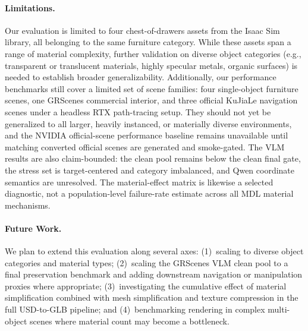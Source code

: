 \paragraph{Limitations.}
Our evaluation is limited to four chest-of-drawers assets from the Isaac Sim
library, all belonging to the same furniture category. While these assets span
a range of material complexity, further validation on diverse object categories
(e.g., transparent or translucent materials, highly specular metals, organic
surfaces) is needed to establish broader generalizability. Additionally, our
performance benchmarks still cover a limited set of scene families: four
single-object furniture scenes, one GRScenes commercial interior, and three
official KuJiaLe navigation scenes under a headless RTX path-tracing setup.
They should not yet be generalized to all larger, heavily instanced, or
materially diverse environments, and the NVIDIA official-scene performance
baseline remains unavailable until matching converted official scenes are
generated and smoke-gated. The VLM results are also claim-bounded: the clean pool remains
below the clean final gate, the stress set is target-centered and category
imbalanced, and Qwen coordinate semantics are unresolved. The material-effect
matrix is likewise a selected diagnostic, not a population-level failure-rate
estimate across all MDL material mechanisms.

\paragraph{Future Work.}
We plan to extend this evaluation along several axes: (1)~scaling to diverse
object categories and material types; (2)~scaling the GRScenes VLM clean pool
to a final preservation benchmark and adding downstream navigation or
manipulation proxies where appropriate; (3)~investigating the cumulative effect
of material simplification combined with mesh simplification and texture
compression in the full USD-to-GLB pipeline; and
(4)~benchmarking rendering in complex multi-object scenes where material count
may become a bottleneck.

